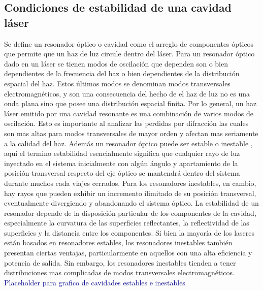 \documentclass[10pt, a4paper]{article}%
\begin{document}
\begin{multicols}{2}
\subsection{Condiciones de estabilidad de una cavidad láser }
Se define un resonador óptico o cavidad como el arreglo de componentes ópticos que permite que un haz de luz circule dentro del láser. Para un resonador óptico dado en un láser se tienen modos de oscilación que dependen son o bien dependientes de la frecuencia del haz o bien dependientes de la distribución espacial del haz. Estos últimos modos se denominan modos transversales electromagnéticos, y son una consecuencia del hecho de el haz de luz no es una onda plana sino que posee una distribución espacial finita. Por lo general, un haz láser emitido por una cavidad resonante es una combinación de varios modos de oscilación. Esto es importante al analizar las perdidas por difracción las cuales son mas altas para modos transversales de mayor orden y afectan mas seriamente a la calidad del haz. Además un resonador óptico puede ser estable o inestable , aquí el termino estabilidad esencialmente significa que cualquier rayo de luz inyectado en el sistema inicialmente con algún ángulo y apartamiento de la posición transversal respecto del eje óptico se mantendrá dentro del sistema durante muchos cada viajes cerrados. Para los resonadores inestables, en cambio, hay rayos que pueden exhibir un incremento ilimitado de su posición transversal, eventualmente divergiendo y abandonando el sistema óptico. La estabilidad de un resonador depende de la disposición particular de los componentes de la cavidad, especialmente la curvatura de las superficies reflectantes, la reflectividad de las superficies y la distancia entre los componentes. Si bien la mayoría de los laseres están basados en resonadores estables, los resonadores inestables también presentan ciertas ventajas, particularmente en aquellos con una alta eficiencia y potencia de salida. Sin embargo, los resonadores inestables tienden a tener distribuciones mas complicadas de modos transversales electromagnéticos.
\newline
\textcolor{DarkBlue}{Placeholder para grafico de cavidades estables e inestables}
\newline

\end{multicols}
\end{document}
